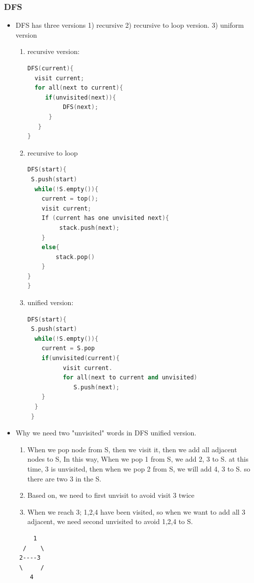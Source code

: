 \documentclass[a4paper,12pt,twoside]{book}
\begin{document}
\subsubsection{DFS}
\begin{itemize}
\item DFS has three versions 1) recursive 2) recursive to loop version. 3) uniform version
\begin{enumerate}
\item recursive version:
\begin{lstlisting}[frame=single, language=c++]
DFS(current){
  visit current;
  for all(next to current){
     if(unvisited(next)){
          DFS(next);
      }
   }
}
\end{lstlisting} 
\item recursive to loop
\begin{lstlisting}[frame=single, language=c++]
DFS(start){
 S.push(start)  
  while(!S.empty()){
    current = top();
    visit current;
    If (current has one unvisited next){ 
         stack.push(next);
    }   
    else{
        stack.pop()
    }
}
}
\end{lstlisting} 
\item unified version:
\begin{lstlisting}[frame=single, language=c++]
DFS(start){
 S.push(start)  
  while(!S.empty()){
    current = S.pop
    if(unvisited(current){
          visit current.
          for all(next to current and unvisited)
             S.push(next);
    }
  }
 }
\end{lstlisting} 
\end{enumerate}

\item  Why we need two "unvisited" words in DFS unified version.  
\begin{enumerate}
\item When we pop node from S, then we visit it, then we add all adjacent nodes to S, In this way, When we pop 1 from S, we add 2, 3 to S. at this time, 3 is unvisited, then when we pop 2 from S, we will add 4, 3 to S. so there are two 3 in the S. 
\item Based on, we need to first unvisit to avoid visit 3 twice

\item When we reach 3; 1,2,4 have been visited, so when we want to add all 3 adjacent, we need second unvisited to avoid 1,2,4 to S.  
\end{enumerate}
\begin{verbatim}
     1
  /    \
 2----3
 \     /
    4      
\end{verbatim}


\end{itemize}
\end{document}
